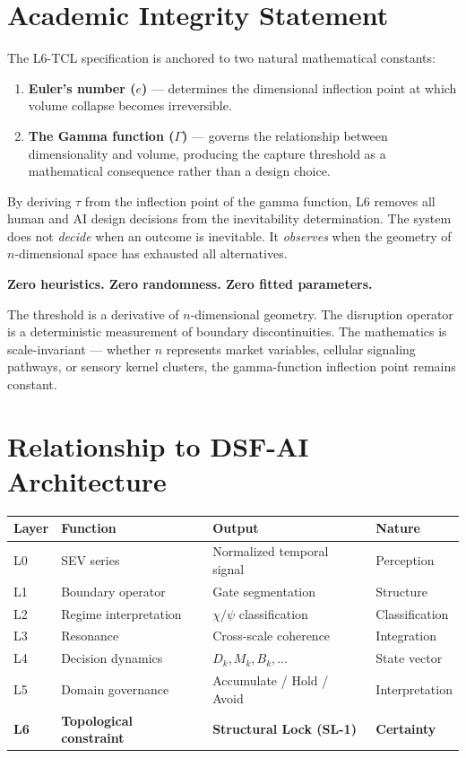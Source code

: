 \documentclass[11pt, a4paper]{article}
\begin{document}
\section{Academic Integrity Statement}

The L6-TCL specification is anchored to two natural mathematical constants:

\begin{enumerate}
  \item \textbf{Euler's number ($e$)} --- determines the dimensional
        inflection point at which volume collapse becomes irreversible.
  \item \textbf{The Gamma function ($\Gamma$)} --- governs the relationship
        between dimensionality and volume, producing the capture threshold
        as a mathematical consequence rather than a design choice.
\end{enumerate}

By deriving $\tau$ from the inflection point of the gamma function, L6
removes all human and AI design decisions from the inevitability
determination. The system does not \textit{decide} when an outcome is
inevitable. It \textit{observes} when the geometry of $n$-dimensional
space has exhausted all alternatives.

\textbf{Zero heuristics. Zero randomness. Zero fitted parameters.}

The threshold is a derivative of $n$-dimensional geometry. The disruption
operator is a deterministic measurement of boundary discontinuities. The
mathematics is scale-invariant --- whether $n$ represents market variables,
cellular signaling pathways, or sensory kernel clusters, the gamma-function
inflection point remains constant.

\section{Relationship to DSF-AI Architecture}

\begin{center}
\begin{tabular}{@{}llll@{}}
\toprule
\textbf{Layer} & \textbf{Function} & \textbf{Output} & \textbf{Nature} \\
\midrule
L0 & SEV series & Normalized temporal signal & Perception \\
L1 & Boundary operator & Gate segmentation & Structure \\
L2 & Regime interpretation & $\chi/\psi$ classification & Classification \\
L3 & Resonance & Cross-scale coherence & Integration \\
L4 & Decision dynamics & $D_k, M_k, B_k, \ldots$ & State vector \\
L5 & Domain governance & Accumulate / Hold / Avoid & Interpretation \\
\textbf{L6} & \textbf{Topological constraint} & \textbf{Structural Lock (SL-1)} & \textbf{Certainty} \\
\bottomrule
\end{tabular}
\end{center}
\end{document}
